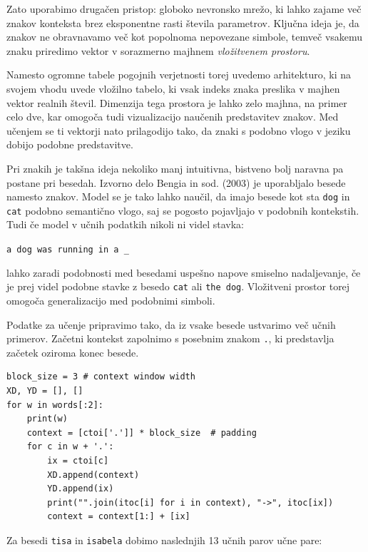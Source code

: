 Zato uporabimo drugačen pristop: globoko nevronsko mrežo, ki lahko zajame več znakov konteksta brez eksponentne rasti števila parametrov. Ključna ideja je, da znakov ne obravnavamo več kot popolnoma nepovezane simbole, temveč vsakemu znaku priredimo vektor v sorazmerno majhnem \emph{vložitvenem prostoru}.

%
Namesto ogromne tabele pogojnih verjetnosti torej uvedemo arhitekturo, ki na svojem vhodu uvede vložilno tabelo, ki vsak indeks znaka preslika v majhen vektor realnih števil. Dimenzija tega prostora je lahko zelo majhna, na primer celo dve, kar omogoča tudi vizualizacijo naučenih predstavitev znakov. Med učenjem se ti vektorji nato prilagodijo tako, da znaki s podobno vlogo v jeziku dobijo podobne predstavitve.

Pri znakih je takšna ideja nekoliko manj intuitivna, bistveno bolj naravna pa postane pri besedah. Izvorno delo Bengia in sod. (2003) je uporabljalo besede namesto znakov. Model se je tako lahko naučil, da imajo besede kot sta \texttt{dog} in \texttt{cat} podobno semantično vlogo, saj se pogosto pojavljajo v podobnih kontekstih. Tudi če model v učnih podatkih nikoli ni videl stavka:
\begin{center}
\texttt{a dog was running in a \_}
\end{center}
lahko zaradi podobnosti med besedami uspešno napove smiselno nadaljevanje, če je prej videl podobne stavke z besedo \texttt{cat} ali \texttt{the dog}. Vložitveni prostor torej omogoča generalizacijo med podobnimi simboli.

Podatke za učenje pripravimo tako, da iz vsake besede ustvarimo več učnih primerov. Začetni kontekst zapolnimo s posebnim znakom \texttt{.}, ki predstavlja začetek oziroma konec besede.

\vspace*{3mm}
\begin{lstlisting}
block_size = 3 # context window width
XD, YD = [], []
for w in words[:2]:
    print(w)
    context = [ctoi['.']] * block_size  # padding
    for c in w + '.':
        ix = ctoi[c]
        XD.append(context)
        YD.append(ix)
        print("".join(itoc[i] for i in context), "->", itoc[ix])
        context = context[1:] + [ix]
\end{lstlisting}

Za besedi \texttt{tisa} in \texttt{isabela} dobimo naslednjih 13 učnih parov učne pare:

